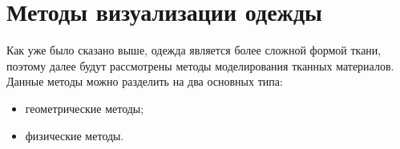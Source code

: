 \section{Методы визуализации одежды}

Как уже было сказано выше, одежда является более сложной формой ткани,
поэтому далее будут рассмотрены методы моделирования тканных материалов.
Данные методы можно разделить на два основных типа:
\begin{itemize}[left=\parindent]
    \item геометрические методы;
    \item физические методы.
\end{itemize}

%
%
%
%
